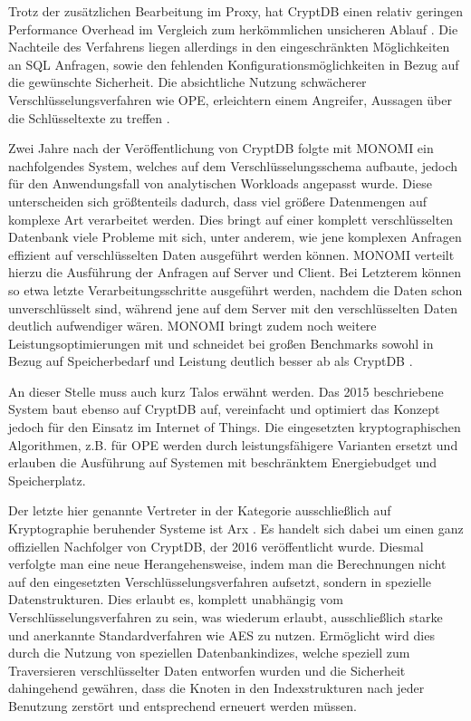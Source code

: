 Trotz der zusätzlichen Bearbeitung im Proxy, hat CryptDB einen relativ geringen Performance Overhead im Vergleich zum herkömmlichen unsicheren Ablauf \cite{Popa2012}. Die Nachteile des Verfahrens liegen allerdings in den eingeschränkten Möglichkeiten an SQL Anfragen, sowie den fehlenden Konfigurationsmöglichkeiten in Bezug auf die gewünschte Sicherheit. Die absichtliche Nutzung schwächerer Verschlüsselungsverfahren wie OPE, erleichtern einem Angreifer, Aussagen über die Schlüsseltexte zu treffen \cite{Poddar2016}.

Zwei Jahre nach der Veröffentlichung von CryptDB folgte mit MONOMI \cite{Tu2013} ein nachfolgendes System, welches auf dem Verschlüsselungsschema aufbaute, jedoch für den Anwendungsfall von analytischen Workloads angepasst wurde. Diese unterscheiden sich größtenteils dadurch, dass viel größere Datenmengen auf komplexe Art verarbeitet werden. Dies bringt auf einer komplett verschlüsselten Datenbank viele Probleme mit sich, unter anderem, wie jene komplexen Anfragen effizient auf verschlüsselten Daten ausgeführt werden können. MONOMI verteilt hierzu die Ausführung der Anfragen auf Server und Client. Bei Letzterem können so etwa letzte Verarbeitungsschritte ausgeführt werden, nachdem die Daten schon unverschlüsselt sind, während jene auf dem Server mit den verschlüsselten Daten deutlich aufwendiger wären. MONOMI bringt zudem noch weitere Leistungsoptimierungen mit und schneidet bei großen Benchmarks sowohl in Bezug auf Speicherbedarf und Leistung deutlich besser ab als CryptDB \cite{Tu2013}.

An dieser Stelle muss auch kurz Talos \cite{Shafagh2015} erwähnt werden. Das 2015 beschriebene System baut ebenso auf CryptDB auf, vereinfacht und optimiert das Konzept jedoch für den Einsatz im Internet of Things. Die eingesetzten kryptographischen Algorithmen, z.B. für OPE werden durch leistungsfähigere Varianten ersetzt und erlauben die Ausführung auf Systemen mit beschränktem Energiebudget und Speicherplatz.

Der letzte hier genannte Vertreter in der Kategorie ausschließlich auf Kryptographie beruhender Systeme ist Arx \cite{Poddar2016}. Es handelt sich dabei um einen ganz offiziellen Nachfolger von CryptDB, der 2016 veröffentlicht wurde. Diesmal verfolgte man eine neue Herangehensweise, indem man die Berechnungen nicht auf den eingesetzten Verschlüsselungsverfahren aufsetzt, sondern in spezielle Datenstrukturen. Dies erlaubt es, komplett unabhängig vom Verschlüsselungsverfahren zu sein, was wiederum erlaubt, ausschließlich starke und anerkannte Standardverfahren wie AES zu nutzen. Ermöglicht wird dies durch die Nutzung von speziellen Datenbankindizes, welche speziell zum Traversieren verschlüsselter Daten entworfen wurden und die Sicherheit dahingehend gewähren, dass die Knoten in den Indexstrukturen nach jeder Benutzung zerstört und entsprechend erneuert werden müssen.

